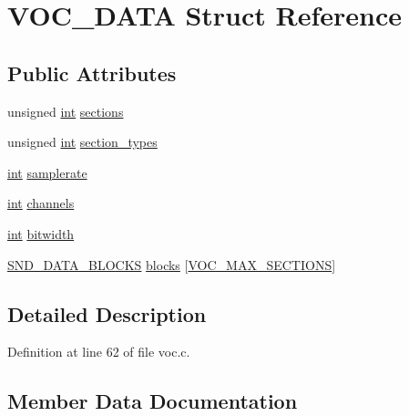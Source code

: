 \hypertarget{struct_v_o_c___d_a_t_a}{}\section{V\+O\+C\+\_\+\+D\+A\+TA Struct Reference}
\label{struct_v_o_c___d_a_t_a}
\subsection*{Public Attributes}
\begin{DoxyCompactItemize}
\item 
unsigned \hyperlink{xmltok_8h_a5a0d4a5641ce434f1d23533f2b2e6653}{int} \hyperlink{struct_v_o_c___d_a_t_a_ae382ee77c3b40079bb08efe509bf9c90}{sections}
\item 
unsigned \hyperlink{xmltok_8h_a5a0d4a5641ce434f1d23533f2b2e6653}{int} \hyperlink{struct_v_o_c___d_a_t_a_a2f7908cf1039ad00367dcfcd0b97c7b7}{section\+\_\+types}
\item 
\hyperlink{xmltok_8h_a5a0d4a5641ce434f1d23533f2b2e6653}{int} \hyperlink{struct_v_o_c___d_a_t_a_a6cc30984b5cc250ca490125148fe7a4d}{samplerate}
\item 
\hyperlink{xmltok_8h_a5a0d4a5641ce434f1d23533f2b2e6653}{int} \hyperlink{struct_v_o_c___d_a_t_a_aa45b0c2d4251107692674020886e899e}{channels}
\item 
\hyperlink{xmltok_8h_a5a0d4a5641ce434f1d23533f2b2e6653}{int} \hyperlink{struct_v_o_c___d_a_t_a_a81f5cdc4e1f5d32b035e58a2f8e789dc}{bitwidth}
\item 
\hyperlink{struct_s_n_d___d_a_t_a___b_l_o_c_k_s}{S\+N\+D\+\_\+\+D\+A\+T\+A\+\_\+\+B\+L\+O\+C\+KS} \hyperlink{struct_v_o_c___d_a_t_a_a01c318507e6cb42462eb57d790b82d7c}{blocks} \mbox{[}\hyperlink{voc_8c_afea965adbbd2393778a62f2dae94273f}{V\+O\+C\+\_\+\+M\+A\+X\+\_\+\+S\+E\+C\+T\+I\+O\+NS}\mbox{]}
\end{DoxyCompactItemize}


\subsection{Detailed Description}


Definition at line 62 of file voc.\+c.



\subsection{Member Data Documentation}
